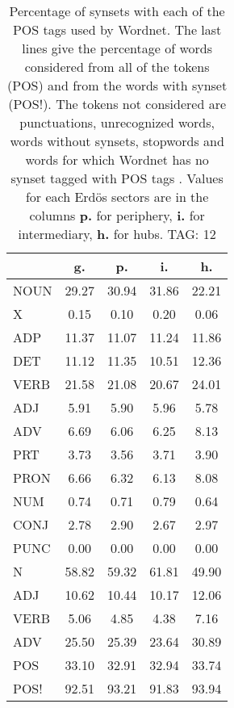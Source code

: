 \begin{table}[h!]
\begin{center}
\begin{tabular}{| l || c | c | c | c |}\hline
 & {\bf g.} & {\bf p.} & {\bf i.} & {\bf h.} \\\hline\hline
NOUN & 29.27  & 30.94  & 31.86  & 22.21 \\
X & 0.15  & 0.10  & 0.20  & 0.06 \\\hline
ADP & 11.37  & 11.07  & 11.24  & 11.86 \\
DET & 11.12  & 11.35  & 10.51  & 12.36 \\\hline
VERB & 21.58  & 21.08  & 20.67  & 24.01 \\\hline
ADJ & 5.91  & 5.90  & 5.96  & 5.78 \\
ADV & 6.69  & 6.06  & 6.25  & 8.13 \\\hline
PRT & 3.73  & 3.56  & 3.71  & 3.90 \\
PRON & 6.66  & 6.32  & 6.13  & 8.08 \\
NUM & 0.74  & 0.71  & 0.79  & 0.64 \\
CONJ & 2.78  & 2.90  & 2.67  & 2.97 \\
PUNC & 0.00  & 0.00  & 0.00  & 0.00 \\\hline\hline\hline
N & 58.82  & 59.32  & 61.81  & 49.90 \\\hline
ADJ & 10.62  & 10.44  & 10.17  & 12.06 \\\hline
VERB & 5.06  & 4.85  & 4.38  & 7.16 \\\hline
ADV & 25.50  & 25.39  & 23.64  & 30.89 \\\hline\hline
POS & 33.10  & 32.91  & 32.94  & 33.74 \\\hline
POS! & 92.51  & 93.21  & 91.83  & 93.94 \\\hline
\end{tabular}
\caption{Percentage of synsets with each of the POS tags used by Wordnet. The last lines give the percentage of words considered from all of the tokens (POS) and from the words with synset (POS!). The tokens not considered are punctuations, unrecognized words, words without synsets, stopwords and words for which Wordnet has no synset  tagged with POS tags . Values for each Erd\"os sectors are in the columns {{\bf p.}} for periphery, {{\bf i.}} for intermediary, {{\bf h.}} for hubs. TAG: 12}
\end{center}
\end{table}
